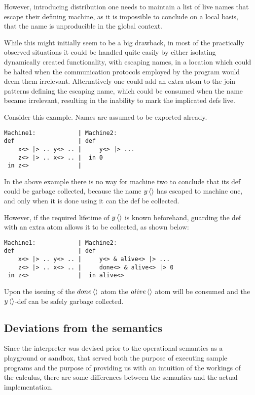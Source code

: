 However, introducing distribution one needs to maintain a list of live names that
escape their defining machine, as it is impossible to
conclude on a local basis, that the name is unproducible in the global context.

While this might initially seem to be a big drawback, in most of the practically
observed situations it could be handled quite easily by either isolating
dynamically created functionality, with escaping names, in a location which
could be halted when the communication protocols employed by the program would
deem them irrelevant.  Alternatively one could add an extra atom to the join
patterns defining the escaping name, which could be consumed when the name
became irrelevant, resulting in the inability to mark the implicated defs live.

Consider this example. Names are assumed to be exported already.
\begin{verbatim}
Machine1:            | Machine2:
def                  | def
    x<> |> .. y<> .. |     y<> |> ...
    z<> |> .. x<> .. |  in 0
 in z<>              |
\end{verbatim}

In the above example there is no way for machine two to conclude that its def
could be garbage collected, because the name $\atm y<>$ has escaped to machine
one, and only when it is done using it can the def be collected.

However, if the required lifetime of $\atm y<>$ is known beforehand, guarding the
def with an extra atom allows it to be collected, as shown below:
\begin{verbatim}
Machine1:            | Machine2:
def                  | def
    x<> |> .. y<> .. |     y<> & alive<> |> ...
    z<> |> .. x<> .. |     done<> & alive<> |> 0
 in z<>              |  in alive<>
\end{verbatim}

Upon the issuing of the $\atm done<>$ atom the $\atm alive<>$ atom will be
consumed and the $\atm y<>$-def can be safely garbage collected.

\subsection*{Deviations from the semantics}
Since the interpreter was devised prior to the operational semantics as a
playground or sandbox, that served both the purpose of executing sample programs
and the purpose of providing us with an intuition of the workings of the
calculus, there are some differences between the semantics and the actual
implementation.

